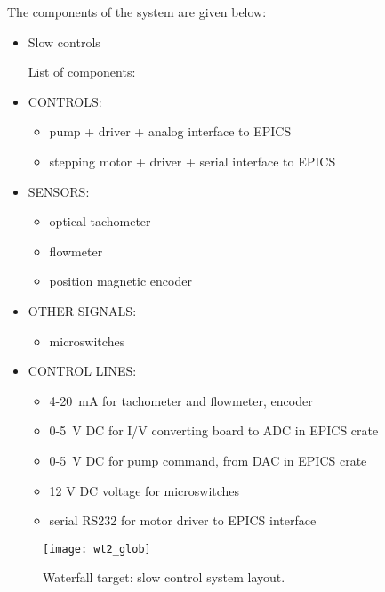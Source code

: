 {The components of the system are given below:

\begin{itemize}
\item Slow controls 


List of components: 

\item CONTROLS: 

\begin{itemize}
\item pump + driver + analog interface to EPICS 
\item stepping motor + driver + serial interface to EPICS 
\end{itemize}
\end{itemize}
\begin{itemize}
\item SENSORS: 

\begin{itemize}
\item optical tachometer 
\item flowmeter 
\item position magnetic encoder 
\end{itemize}
\item OTHER SIGNALS: 

\begin{itemize}
\item microswitches 
\end{itemize}
\item CONTROL LINES: 

\begin{itemize}
\item 4-20~mA for tachometer and flowmeter, encoder 
\item 0-5~V DC for I/V converting board to ADC in EPICS crate 
\item 0-5~V DC for pump command, from DAC in EPICS crate 
\item 12 V DC voltage for microswitches 
\item serial RS232 for motor driver to EPICS interface 
\end{itemize}
\end{itemize}

  \begin{figure}
  \begin{center}
     \texttt{[image: wt2\_glob]}
  \end{center}
  \caption{Waterfall target: slow control system layout.}
  \label{fig:wt_fig1}
  \end{figure}

}
